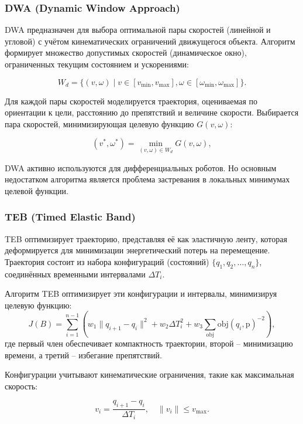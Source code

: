 {\subsubsection{DWA (Dynamic Window Approach)}
DWA предназначен для выбора оптимальной пары скоростей (линейной и угловой) с
учётом кинематических ограничений движущегося объекта. Алгоритм формирует
множество допустимых скоростей (динамическое окно), ограниченных текущим
состоянием и ускорениями:

\begin{equation}
W_d = \{ (v, \omega) \mid v \in [v_{\min}, v_{\max}],	\omega \in [\omega_{\min}, \omega_{\max}] \}.
\end{equation}

Для каждой пары скоростей моделируется траектория,
оцениваемая по ориентации к цели, расстоянию до препятствий и величине скорости.
Выбирается пара скоростей, минимизирующая целевую функцию $G(v, \omega)$:

\begin{equation}
(v^*, \omega^*) = \min_{(v, \omega) \in W_d} G(v, \omega),
\end{equation}

DWA активно используются для дифференциальных роботов. Но основным недостатком алгоритма
является проблема застревания в локальных минимумах целевой функции.

\subsubsection{TEB (Timed Elastic Band)}

TEB оптимизирует траекторию, представляя её как эластичную ленту,
которая деформируется для минимизации энергетический потерь на перемещение.
Траектория состоит из набора конфигураций (состояний) $\{q_1, q_2, \dots, q_n\}$, 
соединённых временными интервалами $\Delta T_i$. 

Алгоритм TEB оптимизирует эти конфигурации и интервалы, минимизируя целевую функцию:
\begin{equation}
	J(B) = \sum_{i=1}^{n-1} \left( w_1 \| q_{i+1} - q_i \|^2 + w_2 \Delta T_i^2 + w_3 \sum_{\text{obj}} \text{obj}(q_i, \text{p})^{-2} \right),
\end{equation}
где первый член обеспечивает компактность траектории, 
второй -- минимизацию времени, 
а третий -- избегание препятствий.

Конфигурации учитывают кинематические ограничения, такие как максимальная скорость:

\begin{equation}
v_i = \frac{q_{i+1} - q_i}{\Delta T_i}, \quad \| v_i \| \leq v_{\max}.
\end{equation}
\vspace{10pt}

}

